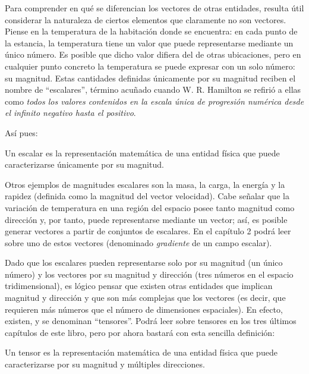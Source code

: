 \documentclass[hidelinks,12pt]{article}
\begin{document}
Para comprender en qué se diferencian los vectores de otras entidades, resulta útil considerar la naturaleza de ciertos elementos que claramente no son vectores. Piense en la temperatura de la habitación donde se encuentra: en cada punto de la estancia, la temperatura tiene un valor que puede representarse mediante un único número. Es posible que dicho valor difiera del de otras ubicaciones, pero en cualquier punto concreto la temperatura se puede expresar con un solo número: su magnitud. Estas cantidades definidas únicamente por su magnitud reciben el nombre de \enquote{escalares}, término acuñado cuando W. R. Hamilton se refirió a ellas como \emph{todos los valores contenidos en la escala única de progresión numérica desde el infinito negativo hasta el positivo}.
\par
Así pues:
\begin{tcolorbox}
Un escalar es la representación matemática de una entidad física que puede caracterizarse únicamente por su magnitud.
\end{tcolorbox}

Otros ejemplos de magnitudes escalares son la masa, la carga, la energía y la rapidez (definida como la magnitud del vector velocidad). Cabe señalar que la variación de temperatura en una región del espacio posee tanto magnitud como dirección y, por tanto, puede representarse mediante un vector; así, es posible generar vectores a partir de conjuntos de escalares. En el capítulo 2 podrá leer sobre uno de estos vectores (denominado \textit{gradiente} de un campo escalar).
\par
Dado que los escalares pueden representarse solo por su magnitud (un único número) y los vectores por su magnitud y dirección (tres números en el espacio tridimensional), es lógico pensar que existen otras entidades que implican magnitud y dirección y que son más complejas que los vectores (es decir, que requieren más números que el número de dimensiones espaciales). En efecto, existen, y se denominan \enquote{tensores}. Podrá leer sobre tensores en los tres últimos capítulos de este libro, pero por ahora bastará con esta sencilla definición:
\begin{tcolorbox}
Un tensor es la representación matemática de una entidad física que puede caracterizarse por su magnitud y múltiples direcciones.
\end{tcolorbox}
\end{document}
